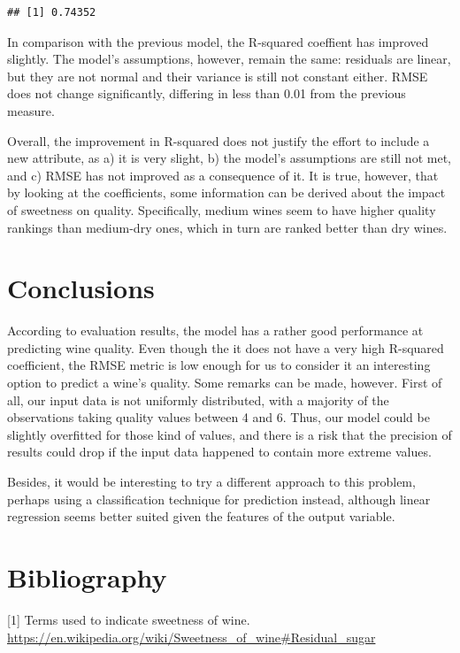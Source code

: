 \documentclass[12pt,]{article}
\newenvironment{Shaded}{\begin{snugshade}}{\end{snugshade}}
\newcommand{\KeywordTok}[1]{\textcolor[rgb]{0.13,0.29,0.53}{\textbf{{#1}}}}
\newcommand{\DecValTok}[1]{\textcolor[rgb]{0.00,0.00,0.81}{{#1}}}
\newcommand{\StringTok}[1]{\textcolor[rgb]{0.31,0.60,0.02}{{#1}}}
\newcommand{\CommentTok}[1]{\textcolor[rgb]{0.56,0.35,0.01}{\textit{{#1}}}}
\newcommand{\NormalTok}[1]{{#1}}
\begin{document}
\begin{Shaded}
\end{Shaded}

\begin{verbatim}
## [1] 0.74352
\end{verbatim}

In comparison with the previous model, the R-squared coeffient has
improved slightly. The model's assumptions, however, remain the same:
residuals are linear, but they are not normal and their variance is
still not constant either. RMSE does not change significantly, differing
in less than 0.01 from the previous measure.

Overall, the improvement in R-squared does not justify the effort to
include a new attribute, as a) it is very slight, b) the model's
assumptions are still not met, and c) RMSE has not improved as a
consequence of it. It is true, however, that by looking at the
coefficients, some information can be derived about the impact of
sweetness on quality. Specifically, medium wines seem to have higher
quality rankings than medium-dry ones, which in turn are ranked better
than dry wines.

\section{Conclusions}\label{conclusions}

According to evaluation results, the model has a rather good performance
at predicting wine quality. Even though the it does not have a very high
R-squared coefficient, the RMSE metric is low enough for us to consider
it an interesting option to predict a wine's quality. Some remarks can
be made, however. First of all, our input data is not uniformly
distributed, with a majority of the observations taking quality values
between 4 and 6. Thus, our model could be slightly overfitted for those
kind of values, and there is a risk that the precision of results could
drop if the input data happened to contain more extreme values.

Besides, it would be interesting to try a different approach to this
problem, perhaps using a classification technique for prediction
instead, although linear regression seems better suited given the
features of the output variable.

\section{Bibliography}\label{bibliography}

{[}1{]} Terms used to indicate sweetness of wine.
\url{https://en.wikipedia.org/wiki/Sweetness_of_wine\#Residual_sugar}
\end{document}
